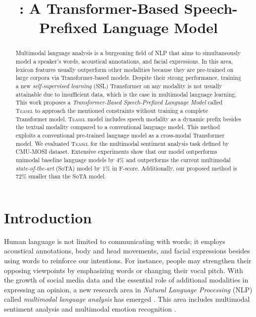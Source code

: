 \documentclass[letterpaper]{article} \usepackage{spconf,amsmath,graphicx}
\title{\teaselns: A Transformer-Based Speech-Prefixed Language Model}
\newcommand{\teasel}{\textsc{Teasel }}
\begin{document}
\maketitle

\begin{abstract}
Multimodal language analysis is a burgeoning field of NLP that aims to simultaneously model a speaker's words, acoustical annotations, and facial expressions. In this area, lexicon features usually outperform other modalities because they are pre-trained on large corpora via Transformer-based models. Despite their strong performance, training a new \textit{self-supervised learning} (SSL) Transformer on any modality is not usually attainable due to insufficient data, which is the case in multimodal language learning. This work proposes a \textit{Transformer-Based Speech-Prefixed Language Model} called \teasel to approach the mentioned constraints without training a complete Transformer model. \teasel model includes speech modality as a dynamic prefix besides the textual modality compared to a conventional language model. This method exploits a conventional pre-trained language model as a cross-modal Transformer model. We evaluated \teasel for the multimodal sentiment analysis task defined by CMU-MOSI dataset. Extensive experiments show that our model outperforms unimodal baseline language models by 4\% and outperforms the current multimodal \textit{state-of-the-art} (SoTA) model by 1\% in F-score. Additionally, our proposed method is 72\% smaller than the SoTA model.

\end{abstract}

\section{Introduction}

Human language is not limited to communicating with words; it employs acoustical annotations, body and head movements, and facial expressions besides using words to reinforce our intentions. For instance, people may strengthen their opposing viewpoints by emphasizing words or changing their vocal pitch. With the growth of social media data and the essential role of additional modalities in expressing an opinion, a new research area in \textit{Natural Language Processing} (NLP) called \textit{multimodal language analysis} has emerged \cite{challenge-hml-2020-grand}. This area includes multimodal sentiment analysis \cite{morency_towards_2011, soleymani2017survey} and multimodal emotion recognition \cite{bagher-zadeh-etal-2018-multimodal, busso2008iemocap}. 
\end{document}
